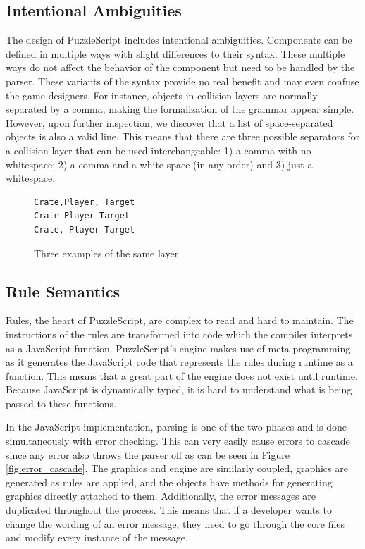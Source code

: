 \subsection{Intentional Ambiguities}
The design of PuzzleScript includes intentional ambiguities. Components can be defined in multiple ways with slight differences to their syntax. These multiple ways do not affect the behavior of the component but need to be handled by the parser. These variants of the syntax provide no real benefit and may even confuse the game designers. For instance, objects in collision layers are normally separated by a comma, making the formalization of the grammar appear simple. However, upon further inspection, we discover that a list of space-separated objects is also a valid line. This means that there are three possible separators for a collision layer that can be used interchangeable: 1) a comma with no whitespace; 2) a comma and a white space (in any order) and 3) just a whitespace.


\begin{figure}[!t]
\begin{lstlisting}[language=PuzzleScript]
Crate,Player, Target
Crate Player Target
Crate, Player Target
\end{lstlisting}
\vspace*{-8pt}
\caption{Three examples of the same layer}
\label{fig:Layer Example}
\vspace*{-8pt}
\end{figure}

\subsection{Rule Semantics}
Rules, the heart of PuzzleScript, are complex to read and hard to maintain. The instructions of the rules are transformed into code which the compiler interprets as a JavaScript function. PuzzleScript's engine makes use of meta-programming as it generates the JavaScript code that represents the rules during runtime as a function. This means that a great part of the engine does not exist until runtime. Because JavaScript is dynamically typed, it is hard to understand what is being passed to these functions. 

In the JavaScript implementation, parsing is one of the two phases and is done simultaneously with error checking. This can very easily cause errors to cascade since any error also throws the parser off as can be seen in Figure \ref{fig:error_cascade}. The graphics and engine are similarly coupled, graphics are generated as rules are applied, and the objects have methods for generating graphics directly attached to them. Additionally, the error messages are duplicated throughout the process. This means that if a developer wants to change the wording of an error message, they need to go through the core files and modify every instance of the message.

